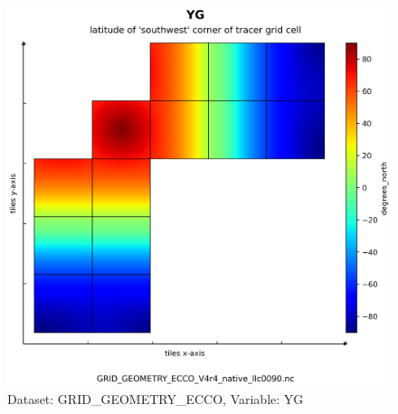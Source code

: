 \begin{figure}[H]
\centering
\includegraphics[scale=0.55]{../images/plots/native_plots_coords/Geometry_Parameters_for_the_Lat-Lon-Cap_90_(llc90)_Native_Model_Grid_(Version_4_Release_4)/YG.png}
\caption{Dataset: GRID\_GEOMETRY\_ECCO, Variable: YG}
\label{tab:table-GRID_GEOMETRY_ECCO_YG-Plot}
\end{figure}
\pagebreak
